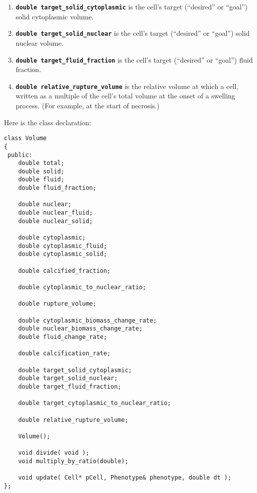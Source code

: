\documentclass[12pt]{article}
\newcommand{\beq}{\begin{equation}}
\newcommand{\eeq}{\end{equation}}
\newcommand{\smallcode}[1]{\textbf{\texttt{#1}}}
\begin{document}
\begin{enumerate}
\item 
\smallcode{double target\_solid\_cytoplasmic} is the cell's target (``desired'' or ``goal'') solid cytoplasmic volume. 

\item 
\smallcode{double target\_solid\_nuclear} is the cell's target (``desired'' or ``goal'') solid nuclear volume. 

\item 
\smallcode{double target\_fluid\_fraction} is the cell's target (``desired'' or ``goal'') fluid fraction. 

\item 
\smallcode{double relative\_rupture\_volume} is the relative volume 
at which a cell, written as a 
multiple of the cell's total volume at the onset of a swelling process. 
(For example, at the start of necrosis.) 


\end{enumerate}

Here is the class declaration:
\begin{verbatim}
class Volume
{
 public:
    double total;
    double solid;
    double fluid;
    double fluid_fraction; 
    
    double nuclear;
    double nuclear_fluid;
    double nuclear_solid; 

    double cytoplasmic;
    double cytoplasmic_fluid; 
    double cytoplasmic_solid; 
    
    double calcified_fraction;
    
    double cytoplasmic_to_nuclear_ratio;
    
    double rupture_volume;  
    
    double cytoplasmic_biomass_change_rate; 
    double nuclear_biomass_change_rate; 
    double fluid_change_rate;

    double calcification_rate; 
    
    double target_solid_cytoplasmic;
    double target_solid_nuclear;
    double target_fluid_fraction;
    
    double target_cytoplasmic_to_nuclear_ratio;

    double relative_rupture_volume; 

    Volume();      
    
    void divide( void );      
    void multiply_by_ratio(double);      
    
    void update( Cell* pCell, Phenotype& phenotype, double dt );      
};
\end{verbatim}
\end{document}
